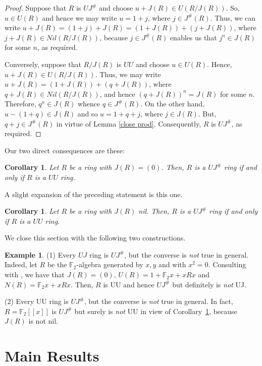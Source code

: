 \documentclass[12pt]{amsart}
\newtheorem{corollary}[theorem]{Corollary}
\theoremstyle{definition}
\newtheorem{example}[theorem]{Example}
\begin{document}
\begin{proof}
Suppose that $R$ is $UJ^{\#}$ and choose $u+J(R)\in U(R/J(R))$. So, $u\in U(R)$ and hence we may write $u=1+j$, where $j\in J^{\#}(R)$. Thus, we can write $u+J(R)=(1+j)+J(R)=(1+J(R)) + (j+J(R))$, where $j+J(R)\in Nil(R/J(R))$, because $j\in J^{\#}(R)$ enables us that $j^n\in J(R)$ for some $n$, as required.

Conversely, suppose that $R/J(R)$ is $UU$ and choose $u\in U(R)$. Hence, $u+J(R)\in U(R/J(R))$. Thus, we may write $u+J(R)=(1+J(R))+(q+J(R))$, where $q+J(R)\in Nil(R/J(R))$, and hence $(q+J(R))^n=J(R)$ for some $n$. Therefore, $q^n\in J(R)$ whence $q\in J^{\#}(R)$. On the other hand, $u-(1+q)\in J(R)$ and so $u=1+q+j$, where $j\in J(R)$. But, $q+j\in J^{\#}(R)$ in virtue of Lemma \ref{close prod}. Consequently, $R$ is $UJ^{\#}$, as required.
\end{proof}

Our two direct consequences are these:

\begin{corollary}
Let $R$ be a ring with $J(R)=(0)$. Then, $R$ is a $UJ^{\#}$ ring if and only if $R$ is a $UU$ ring.
\end{corollary}

A slight expansion of the preceding statement is this one.

\begin{corollary}\label{nilcor}
Let $R$ be a ring with $J(R)$ nil. Then, $R$ is a $UJ^{\#}$ ring if and only if $R$ is a $UU$ ring.
\end{corollary}

We close this section with the following two constructions.

\begin{example}
(1) Every $UJ$ ring is $UJ^{\#}$, but the converse is {\it not} true in general. Indeed, let $R$ be the $\mathbb{F}_2$-algebra generated by $x, y$ and with $x^2=0$. Consulting with \cite{DL}, we have that $J(R)=(0)$, $U(R)=1+\mathbb{F}_2x+xRx$ and $N(R)=\mathbb{F}_2x+xRx$. Then, $R$ is UU and hence $UJ^{\#}$ but definitely is {\it not} UJ.

(2) Every UU ring is $UJ^{\#}$, but the converse is {\it not} true in general. In fact, $R=\mathbb{F}_2[[x]]$ is $UJ^{\#}$ but surely is {\it not} UU in view of Corollary~\ref{nilcor}, because $J(R)$ is not nil.
\end{example}

\section{Main Results}
\end{document}
